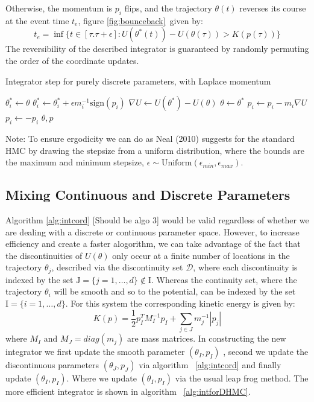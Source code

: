 \documentclass[]{report}
\begin{document}
Otherwise, the momentum is $p_{i}$ flips, and the trajectory $\theta(t)$ reverses its course at the event time $t_{e}$, figure \ref{fig:bounceback}\,  given by:\begin{equation}
	t_{e} = \inf\{t \in [\tau. \tau + \epsilon] : U(\theta^{*}(t)) - U(\theta(\tau)) > K(p(\tau))\}
\end{equation}
The reversibility of the described integrator is guaranteed by randomly permuting the order of the coordinate updates.\\

\begin{algorithm}
	\label{alg:intcord}
	\caption{Integrator step for purely discrete parameters, with Laplace momentum}
		\begin{algorithmic}[1]
			\State $ \theta_{i}^{*} \gets \theta$
			\State $ \theta_{i}^{*} \gets \theta^{*}_{i} + \epsilon m^{-1}_{i} \text{sign}(p_{i})$
			\State $ \nabla U \gets U(\theta^{*}) - U(\theta)$
			\State $ \theta \gets \theta^{*} $
			\State $ p_{i} \gets p_{i} - m_{i} \nabla U$
			\Else
			\State $p_{i} \gets - p_{i}$
			\Endif 
			\State \Return $\theta, p$
		\end{algorithmic} 
\end{algorithm}
Note: To ensure ergodicity we can do as Neal (2010) suggests for the standard HMC by drawing the stepsize from a uniform distribution, where the bounds are the maximum and minimum stepsize, $\epsilon \sim \text{Uniform}(\epsilon_{min}, \epsilon_{max})$. 

\subsection{Mixing Continuous and Discrete Parameters }
Algorithm \ref{alg:intcord} [Should be algo 3] would be valid regardless of whether we are dealing with a discrete or continuous parameter space. However, to increase efficiency and create a faster alogorithm, we can take advantage of the fact that the discontinuities of $U(\theta)$ only occur at a finite number of locations in the trajectory $\theta_{j}$, described via the discontinuity set $\mathcal{D}$, where each discontinuity is indexed by the set $\text{J} = \{j = 1,\ldots,d\} \notin \text{I}$.  Whereas the continuity set, where the trajectory $\theta_{i}$ will be smooth and so to the potential, can be indexed by the set $\text{I} = \{i = 1,\ldots, d\}$. For this system the corresponding kinetic energy is given by: \begin{equation}
K(p) = \frac{1}{2} p_{I}^{T}M_{I}^{-1}p_{I} + \sum_{j \in J}m_{j}^{-1} |p_{j}|
\end{equation}
 where $M_{I}$ and $M_{J} = diag(m_{j})$ are mass matrices.  In constructing the new integrator we first update the smooth parameter $(\theta_{I}, p_{I})$ , second we update the discontinuous parameters $(\theta_{J}, p_{J})$ via algorithm ~\ref{alg:intcord} and finally update $(\theta_{I},p_{I})$.  Where we update $(\theta_{I}, p_{I})$ via the usual leap frog method.  The more efficient integrator is shown in algorithm ~\ref{alg:intforDHMC}.
 
\end{document}
